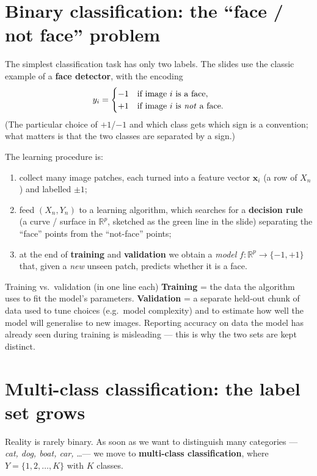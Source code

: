\documentclass{report}
\newcommand{\R}{\mathbb{R}}
\newcommand{\xvec}{\mathbf{x}}
\newcommand{\Xmat}{X_n}
\begin{document}
\section{Binary classification: the ``face / not face'' problem}

The simplest classification task has only two labels. The slides use the
classic example of a \textbf{face detector}, with the encoding
\[
y_i =
\begin{cases}
-1 & \text{if image } i \text{ is a face},\\
+1 & \text{if image } i \text{ is \emph{not} a face}.
\end{cases}
\]
(The particular choice of $+1$/$-1$ and which class gets which sign is a
convention; what matters is that the two classes are separated by a sign.)

The learning procedure is:
\begin{enumerate}
\item collect many image patches, each turned into a feature vector
$\xvec_i$ (a row of $\Xmat$) and labelled $\pm 1$;
\item feed $(\Xmat, Y_n)$ to a learning algorithm, which searches for a
\textbf{decision rule} (a curve / surface in $\R^p$, sketched as the green line
in the slide) separating the ``face'' points from the ``not-face'' points;
\item at the end of \textbf{training} and \textbf{validation} we obtain a
\emph{model} $f:\R^p \to \{-1,+1\}$ that, given a \emph{new} unseen patch,
predicts whether it is a face.
\end{enumerate}

\begin{defbox}{Training vs.\ validation (in one line each)}
\textbf{Training} = the data the algorithm uses to fit the model's parameters.
\textbf{Validation} = a separate held-out chunk of data used to tune choices
(e.g.\ model complexity) and to estimate how well the model will generalise to
new images. Reporting accuracy on data the model has already seen during
training is misleading --- this is why the two sets are kept distinct.
\end{defbox}

\section{Multi-class classification: the label set grows}
Reality is rarely binary. As soon as we want to distinguish many categories ---
\emph{cat, dog, boat, car,} \dots --- we move to \textbf{multi-class
classification}, where $Y = \{1,2,\dots,K\}$ with $K$ classes.
\end{document}
